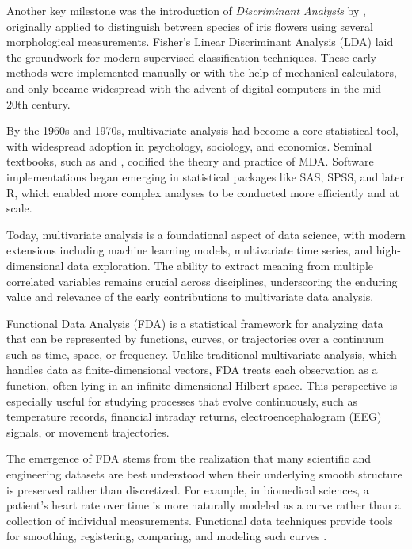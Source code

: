 \documentclass[article]{abntex2}
\begin{document}
Another key milestone was the introduction of \textit{Discriminant Analysis} by , originally applied to distinguish between species of iris flowers using several morphological measurements. Fisher’s Linear Discriminant Analysis (LDA) laid the groundwork for modern supervised classification techniques. These early methods were implemented manually or with the help of mechanical calculators, and only became widespread with the advent of digital computers in the mid-20th century.

By the 1960s and 1970s, multivariate analysis had become a core statistical tool, with widespread adoption in psychology, sociology, and economics. Seminal textbooks, such as  and , codified the theory and practice of MDA. Software implementations began emerging in statistical packages like SAS, SPSS, and later R, which enabled more complex analyses to be conducted more efficiently and at scale.

Today, multivariate analysis is a foundational aspect of data science, with modern extensions including machine learning models, multivariate time series, and high-dimensional data exploration. The ability to extract meaning from multiple correlated variables remains crucial across disciplines, underscoring the enduring value and relevance of the early contributions to multivariate data analysis.

Functional Data Analysis (FDA) is a statistical framework for analyzing data that can be represented by functions, curves, or trajectories over a continuum such as time, space, or frequency. Unlike traditional multivariate analysis, which handles data as finite-dimensional vectors, FDA treats each observation as a function, often lying in an infinite-dimensional Hilbert space. This perspective is especially useful for studying processes that evolve continuously, such as temperature records, financial intraday returns, electroencephalogram (EEG) signals, or movement trajectories.

The emergence of FDA stems from the realization that many scientific and engineering datasets are best understood when their underlying smooth structure is preserved rather than discretized. For example, in biomedical sciences, a patient’s heart rate over time is more naturally modeled as a curve rather than a collection of individual measurements. Functional data techniques provide tools for smoothing, registering, comparing, and modeling such curves .
\end{document}
